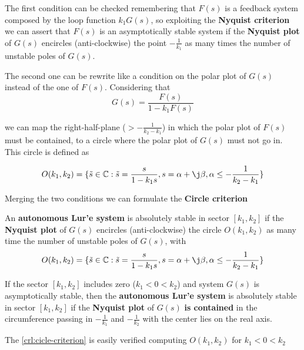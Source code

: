 The first condition can be checked remembering that $F(s)$ is a feedback system composed by the loop function $k_1 G(s)$, so exploiting the \textbf{Nyquist criterion} we can assert that $F(s)$ is an asymptotically stable system if the \textbf{Nyquist plot} of $G(s)$ encircles (anti-clockwise) the point $-\frac{1}{k_1}$ as many times the number of unstable poles of $G(s)$.

The second one can be rewrite like a condition on the polar plot of $G(s)$ instead of the one of $F(s)$. Considering that
\[
    G(s) = \frac{F(s)}{1 - k_1 F(s)}
\]

we can map the right-half-plane ($>-\frac{1}{k_2 - k_1}$) in which the polar plot of $F(s)$ must be contained, to a circle where the polar plot of $G(s)$ must not go in. This circle is defined as

\[
    O(k_1,k_2) = \{\tilde{s} \in \Complex : \tilde{s} = \frac{s}{1-k_1 s}, s = \alpha + \j \beta, \alpha \leq - \frac{1}{k_2 - k_1}\}
\]

Merging the two conditions we can formulate the \textbf{Circle criterion}

\begin{theorem}
    An \textbf{autonomous Lur'e system} is absolutely stable in sector $[k_1,k_2]$ if the \textbf{Nyquist plot} of $G(s)$ encircles (anti-clockwise) the circle $O(k_1, k_2)$ as many time the number of unstable poles of $G(s)$, with
    \[
        O(k_1,k_2) = \{\tilde{s} \in \Complex : \tilde{s} = \frac{s}{1-k_1 s}, s = \alpha + \j \beta, \alpha \leq - \frac{1}{k_2 - k_1}\}
    \]
\end{theorem}

\begin{corollary}\label{crl:cicle-criterion}
    If the sector $[k_1,k_2]$ includes zero ($k_1 < 0 < k_2$) and system $G(s)$ is asymptotically stable, then the \textbf{autonomous Lur'e system} is absolutely stable in sector $[k_1,k_2]$ if the \textbf{Nyquist plot} of $G(s)$ \textbf{is contained} in the circumference passing in $-\frac{1}{k_1}$ and $-\frac{1}{k_2}$ with the center lies on the real axis.
\end{corollary}

\begin{nb}The \cref{crl:cicle-criterion} is easily verified computing $O(k_1,k_2)$ for $k_1 < 0 < k_2$\end{nb}